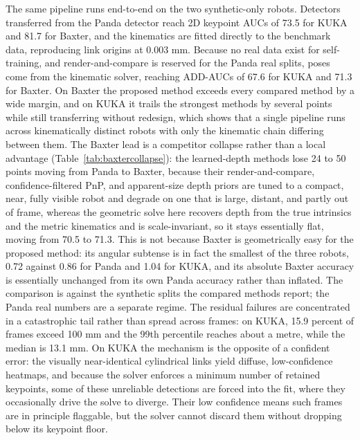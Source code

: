 The same pipeline runs end-to-end on the two synthetic-only robots. Detectors transferred from the Panda detector reach 2D keypoint AUCs of 73.5 for KUKA and 81.7 for Baxter, and the kinematics are fitted directly to the benchmark data, reproducing link origins at 0.003 mm. Because no real data exist for self-training, and render-and-compare is reserved for the Panda real splits, poses come from the kinematic solver, reaching ADD-AUCs of 67.6 for KUKA and 71.3 for Baxter. On Baxter the proposed method exceeds every compared method by a wide margin, and on KUKA it trails the strongest methods by several points while still transferring without redesign, which shows that a single pipeline runs across kinematically distinct robots with only the kinematic chain differing between them. The Baxter lead is a competitor collapse rather than a local advantage (Table~\ref{tab:baxtercollapse}): the learned-depth methods lose 24 to 50 points moving from Panda to Baxter, because their render-and-compare, confidence-filtered PnP, and apparent-size depth priors are tuned to a compact, near, fully visible robot and degrade on one that is large, distant, and partly out of frame, whereas the geometric solve here recovers depth from the true intrinsics and the metric kinematics and is scale-invariant, so it stays essentially flat, moving from 70.5 to 71.3. This is not because Baxter is geometrically easy for the proposed method: its angular subtense is in fact the smallest of the three robots, 0.72 against 0.86 for Panda and 1.04 for KUKA, and its absolute Baxter accuracy is essentially unchanged from its own Panda accuracy rather than inflated. The comparison is against the synthetic splits the compared methods report; the Panda real numbers are a separate regime. The residual failures are concentrated in a catastrophic tail rather than spread across frames: on KUKA, 15.9 percent of frames exceed 100 mm and the 99th percentile reaches about a metre, while the median is 13.1 mm. On KUKA the mechanism is the opposite of a confident error: the visually near-identical cylindrical links yield diffuse, low-confidence heatmaps, and because the solver enforces a minimum number of retained keypoints, some of these unreliable detections are forced into the fit, where they occasionally drive the solve to diverge. Their low confidence means such frames are in principle flaggable, but the solver cannot discard them without dropping below its keypoint floor.
